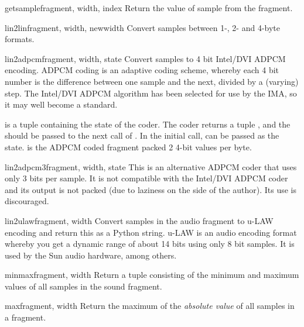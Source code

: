\begin{funcdesc}{getsample}{fragment, width, index}
Return the value of sample  from the fragment.
\end{funcdesc}

\begin{funcdesc}{lin2lin}{fragment, width, newwidth}
Convert samples between 1-, 2- and 4-byte formats.
\end{funcdesc}

\begin{funcdesc}{lin2adpcm}{fragment, width, state}
Convert samples to 4 bit Intel/DVI ADPCM encoding.  ADPCM coding is an
adaptive coding scheme, whereby each 4 bit number is the difference
between one sample and the next, divided by a (varying) step.  The
Intel/DVI ADPCM algorithm has been selected for use by the IMA, so it
may well become a standard.

 is a tuple containing the state of the coder.  The coder
returns a tuple , and the
 should be passed to the next call of
.  In the initial call,  can be
passed as the state.   is the ADPCM coded fragment
packed 2 4-bit values per byte.
\end{funcdesc}

\begin{funcdesc}{lin2adpcm3}{fragment, width, state}
This is an alternative ADPCM coder that uses only 3 bits per sample.
It is not compatible with the Intel/DVI ADPCM coder and its output is
not packed (due to laziness on the side of the author).  Its use is
discouraged.
\end{funcdesc}

\begin{funcdesc}{lin2ulaw}{fragment, width}
Convert samples in the audio fragment to u-LAW encoding and return
this as a Python string.  u-LAW is an audio encoding format whereby
you get a dynamic range of about 14 bits using only 8 bit samples.  It
is used by the Sun audio hardware, among others.
\end{funcdesc}

\begin{funcdesc}{minmax}{fragment, width}
Return a tuple consisting of the minimum and maximum values of all
samples in the sound fragment.
\end{funcdesc}

\begin{funcdesc}{max}{fragment, width}
Return the maximum of the \emph{absolute value} of all samples in a
fragment.
\end{funcdesc}

